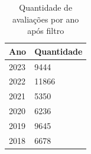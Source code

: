 \begin{table}[]
	\centering
	\begin{tabular}{|l|l|}
		\textbf{Ano} & \textbf{Quantidade} \\\hline
		2023         & 9444                \\
		2022         & 11866               \\
		2021         & 5350                \\
		2020         & 6236                \\
		2019         & 9645                \\
		2018         & 6678
	\end{tabular}
	\caption{Quantidade de avaliações por ano após filtro}
	\label{table:distribuicao_review_per_year}
\end{table}

